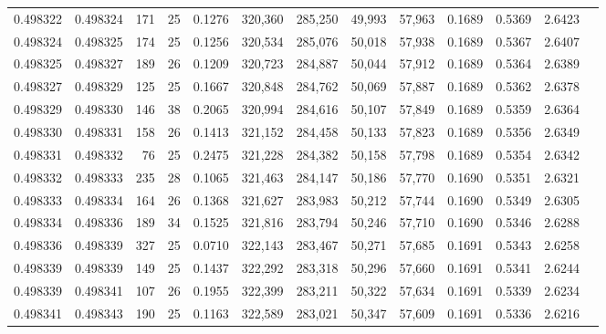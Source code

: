 \begin{tabular}{rrrrrrrrrrrrr}
0.498322 & 0.498324 & 171 &  25 &                                     0.1276 & 320,360 & 285,250 &  49,993 &  57,963 & 0.1689 & 0.5369 & 2.6423 \\
0.498324 & 0.498325 & 174 &  25 &                                     0.1256 & 320,534 & 285,076 &  50,018 &  57,938 & 0.1689 & 0.5367 & 2.6407 \\
0.498325 & 0.498327 & 189 &  26 &                                     0.1209 & 320,723 & 284,887 &  50,044 &  57,912 & 0.1689 & 0.5364 & 2.6389 \\
0.498327 & 0.498329 & 125 &  25 &                                     0.1667 & 320,848 & 284,762 &  50,069 &  57,887 & 0.1689 & 0.5362 & 2.6378 \\
0.498329 & 0.498330 & 146 &  38 &                                     0.2065 & 320,994 & 284,616 &  50,107 &  57,849 & 0.1689 & 0.5359 & 2.6364 \\
0.498330 & 0.498331 & 158 &  26 &                                     0.1413 & 321,152 & 284,458 &  50,133 &  57,823 & 0.1689 & 0.5356 & 2.6349 \\
0.498331 & 0.498332 &  76 &  25 &                                     0.2475 & 321,228 & 284,382 &  50,158 &  57,798 & 0.1689 & 0.5354 & 2.6342 \\
0.498332 & 0.498333 & 235 &  28 &                                     0.1065 & 321,463 & 284,147 &  50,186 &  57,770 & 0.1690 & 0.5351 & 2.6321 \\
0.498333 & 0.498334 & 164 &  26 &                                     0.1368 & 321,627 & 283,983 &  50,212 &  57,744 & 0.1690 & 0.5349 & 2.6305 \\
0.498334 & 0.498336 & 189 &  34 &                                     0.1525 & 321,816 & 283,794 &  50,246 &  57,710 & 0.1690 & 0.5346 & 2.6288 \\
0.498336 & 0.498339 & 327 &  25 &                                     0.0710 & 322,143 & 283,467 &  50,271 &  57,685 & 0.1691 & 0.5343 & 2.6258 \\
0.498339 & 0.498339 & 149 &  25 &                                     0.1437 & 322,292 & 283,318 &  50,296 &  57,660 & 0.1691 & 0.5341 & 2.6244 \\
0.498339 & 0.498341 & 107 &  26 &                                     0.1955 & 322,399 & 283,211 &  50,322 &  57,634 & 0.1691 & 0.5339 & 2.6234 \\
0.498341 & 0.498343 & 190 &  25 &                                     0.1163 & 322,589 & 283,021 &  50,347 &  57,609 & 0.1691 & 0.5336 & 2.6216 \\

\end{tabular}
